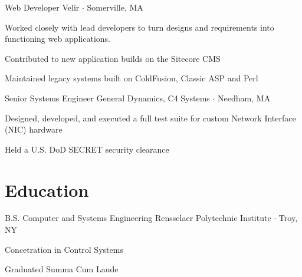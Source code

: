 \documentclass{article}
\begin{document}
{Web Developer}
{Velir $\cdot$ Somerville, MA}
{
  \begin{compactitem}
    \item Worked closely with lead developers to turn designs and requirements into functioning web applications. 
    \item Contributed to new application builds on the Sitecore CMS
    \item Maintained legacy systems built on ColdFusion, Classic ASP and Perl
  \end{compactitem}
}

{Senior Systems Engineer}
{General Dynamics, C4 Systems $\cdot$ Needham, MA}
{
  \begin{compactitem}
    \item Designed, developed, and executed a full test suite for custom Network Interface (NIC) hardware
    \item Held a U.S. DoD SECRET security clearance
  \end{compactitem}
}

\section{Education}

{B.S. Computer and Systems Engineering}
{Rensselaer Polytechnic Institute $\cdot$ Troy, NY}
{
  \begin{compactitem}
    \item Concetration in Control Systems
    \item Graduated Summa Cum Laude
  \end{compactitem}
}
\end{document}
